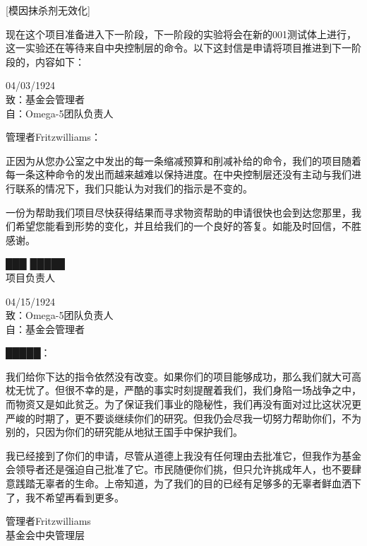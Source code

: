 \begin{scpboxc}
{[模因抹杀剂无效化]}
\end{scpboxc}

\begin{scpboxbbwm}


现在这个项目准备进入下一阶段，下一阶段的实验将会在新的001测试体上进行，这一实验还在等待来自中央控制层的命令。以下这封信是申请将项目推进到下一阶段的，内容如下：

\begin{scpbox}

04/03/1924\\
致：基金会管理者\\
自：Omega-5团队负责人

管理者Fritzwilliams：

正因为从您办公室之中发出的每一条缩减预算和削减补给的命令，我们的项目随着每一条这种命令的发出而越来越难以保持进度。在中央控制层还没有主动与我们进行联系的情况下，我们只能认为对我们的指示是不变的。

一份为帮助我们项目尽快获得结果而寻求物资帮助的申请很快也会到达您那里，我们希望您能看到形势的变化，并且给我们的一个良好的答复。如能及时回信，不胜感谢。

███ █████\\
项目负责人

\end{scpbox}

04/15/1924\\
致：Omega-5团队负责人\\
自：基金会管理者

█████：

我们给你下达的指令依然没有改变。如果你们的项目能够成功，那么我们就大可高枕无忧了。但很不幸的是，严酷的事实时刻提醒着我们，我们身陷一场战争之中，而物资又是如此贫乏。为了保证我们事业的隐秘性，我们再没有面对过比这状况更严峻的时期了，更不要谈继续你们的研究。但我仍会尽我一切努力帮助你们，不为别的，只因为你们的研究能从地狱王国手中保护我们。

我已经接到了你们的申请，尽管从道德上我没有任何理由去批准它，但我作为基金会领导者还是强迫自己批准了它。市民随便你们挑，但只允许挑成年人，也不要肆意践踏无辜者的生命。上帝知道，为了我们的目的已经有足够多的无辜者鲜血洒下了，我不希望再看到更多。

管理者Fritzwilliams\\
基金会中央管理层

\end{scpboxbbwm}



